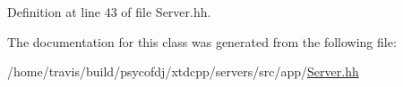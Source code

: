 Definition at line 43 of file Server.\-hh.



The documentation for this class was generated from the following file\-:\begin{DoxyCompactItemize}
\item 
/home/travis/build/psycofdj/xtdcpp/servers/src/app/\hyperlink{Server_8hh}{Server.\-hh}\end{DoxyCompactItemize}

